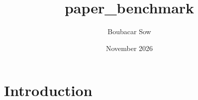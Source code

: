 \documentclass{article}
\title{paper_benchmark}
\author{Boubacar Sow}
\date{November 2026}
\begin{document}
\maketitle

\section{Introduction}
\end{document}
